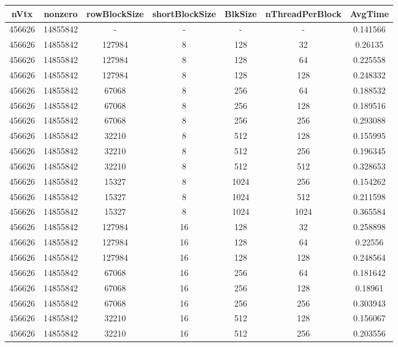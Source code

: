 \documentclass[9pt]{article}
\begin{document}
\SetBgPosition{0.25cm,-5.0cm}
\begin{tabular}{|c|c|c|c|c|c|c| }  
\hline
nVtx  & nonzero  & rowBlockSize  & shortBlockSize  & BlkSize  & nThreadPerBlock  & AvgTime \\
\hline
456626  & 14855842  &  -  & -  & -  & -  &0.141566 \\
\hline
456626  & 14855842  & 127984  & 8  & 128  & 32  & 0.26135 \\
\hline
456626  & 14855842  & 127984  & 8  & 128  & 64  & 0.225558 \\
\hline
456626  & 14855842  & 127984  & 8  & 128  & 128  & 0.248332 \\
\hline
456626  & 14855842  & 67068  & 8  & 256  & 64  & 0.188532 \\
\hline
456626  & 14855842  & 67068  & 8  & 256  & 128  & 0.189516 \\
\hline
456626  & 14855842  & 67068  & 8  & 256  & 256  & 0.293088 \\
\hline
456626  & 14855842  & 32210  & 8  & 512  & 128  & 0.155995 \\
\hline
456626  & 14855842  & 32210  & 8  & 512  & 256  & 0.196345 \\
\hline
456626  & 14855842  & 32210  & 8  & 512  & 512  & 0.328653 \\
\hline
456626  & 14855842  & 15327  & 8  & 1024  & 256  & 0.154262 \\
\hline
456626  & 14855842  & 15327  & 8  & 1024  & 512  & 0.211598 \\
\hline
456626  & 14855842  & 15327  & 8  & 1024  & 1024  & 0.365584 \\
\hline
456626  & 14855842  & 127984  & 16  & 128  & 32  & 0.258898 \\
\hline
456626  & 14855842  & 127984  & 16  & 128  & 64  & 0.22556 \\
\hline
456626  & 14855842  & 127984  & 16  & 128  & 128  & 0.248564 \\
\hline
456626  & 14855842  & 67068  & 16  & 256  & 64  & 0.181642 \\
\hline
456626  & 14855842  & 67068  & 16  & 256  & 128  & 0.18961 \\
\hline
456626  & 14855842  & 67068  & 16  & 256  & 256  & 0.303943 \\
\hline
456626  & 14855842  & 32210  & 16  & 512  & 128  & 0.156067 \\
\hline
456626  & 14855842  & 32210  & 16  & 512  & 256  & 0.203556 \\

\end{tabular}
\end{document}
